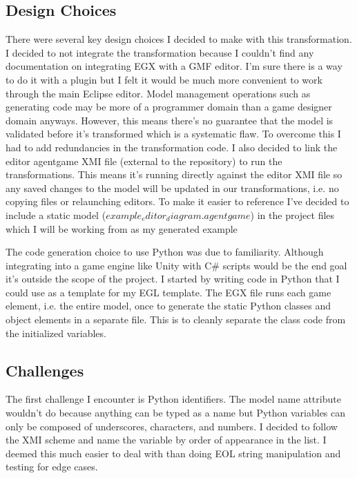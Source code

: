 \documentclass[letterpaper,12pt]{article}  %
\begin{document}
\subsection{Design Choices}
There were several key design choices I decided to make with this transformation. I decided to not integrate the transformation because I couldn’t find any documentation on integrating EGX with a GMF editor. I’m sure there is a way to do it with a plugin but I felt it would be much more convenient to work through the main Eclipse editor. Model management operations such as generating code may be more of a programmer domain than a game designer domain anyways. However, this means there’s no guarantee that the model is validated before it’s transformed which is a systematic flaw. To overcome this I had to add redundancies in the transformation code. I also decided to link the editor agentgame XMI file (external to the repository) to run the transformations. This means it’s running directly against the editor XMI file so any saved changes to the model will be updated in our transformations, i.e. no copying files or relaunching editors. To make it easier to reference I’ve decided to include a static model ($example_editor_diagram.agentgame$) in the project files which I will be working from as my generated example

The code generation choice to use Python was due to familiarity. Although integrating into a game engine like Unity with C# scripts would be the end goal it’s outside the scope of the project. I started by writing code in Python that I could use as a template for my EGL template. The EGX file runs each game element, i.e. the entire model, once to generate the static Python classes and object elements in a separate file. This is to cleanly separate the class code from the initialized variables.

\subsection{Challenges}
The first challenge I encounter is Python identifiers. The model name attribute wouldn’t do because anything can be typed as a name but Python variables can only be composed of underscores, characters, and numbers. I decided to follow the XMI scheme and name the variable by order of appearance in the list. I deemed this much easier to deal with than doing EOL string manipulation and testing for edge cases.
\end{document}
